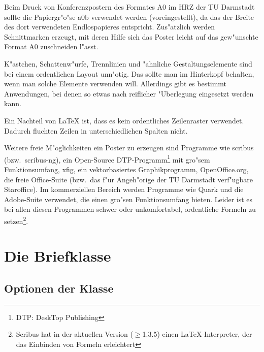 \documentclass[twoside,colorback,accentcolor=tud4c,11pt]{tudreport}
\begin{document}
    Beim Druck von Konferenzpostern des Formates A0 im HRZ der TU Darmstadt sollte die
    Papiergr"o"se a0b verwendet werden (voreingestellt), da das der Breite des
    dort verwendeten Endlospapieres entspricht. Zus"atzlich werden
    Schnittmarken erzeugt, mit deren Hilfe sich das Poster leicht auf das
    gew"unschte Format A0 zuschneiden l"asst.

    K"astchen, Schattenw"urfe, Trennlinien und "ahnliche 
    \glqq Gestaltungselemente\grqq{} sind bei einem ordentlichen Layout unn"otig.
    Das sollte man im Hinterkopf behalten, wenn man solche Elemente verwenden
    will. Allerdings gibt es bestimmt Anwendungen, bei denen so etwas nach
    reiflicher "Uberlegung eingesetzt werden kann.

    Ein Nachteil von \LaTeX{} ist, dass es kein ordentliches Zeilenraster
    verwendet. Dadurch fluchten Zeilen in unterschiedlichen Spalten nicht.

    Weitere freie M"oglichkeiten ein Poster zu erzeugen sind Programme wie scribus
    (bzw.\ scribus-ng), ein Open-Source DTP-Programm\footnote{DTP: DeskTop
    Publishing} mit gro"sem Funktionsumfang, xfig, ein vektorbasiertes
    Graphikprogramm, OpenOffice.org, die freie Office-Suite (bzw.\ das f"ur
    Angeh"orige der TU Darmstadt verf"ugbare Staroffice). Im kommerziellen Bereich werden
    Programme wie Quark und die Adobe-Suite verwendet, die einen gro"sen
    Funktionsumfang bieten. Leider ist es bei allen diesen Programmen schwer
    oder unkomfortabel, ordentliche Formeln zu setzen\footnote{Scribus hat in
    der aktuellen Version ($\ge$1.3.5) einen \LaTeX-Interpreter, der das Einbinden von Formeln
    erleichtert}.

\chapter{Die Briefklasse \texorpdfstring{}{tudletter}}\label{chap:tudletter}
  \section{Optionen der Klasse \texorpdfstring{}{tudletter}}
    
\end{document}

